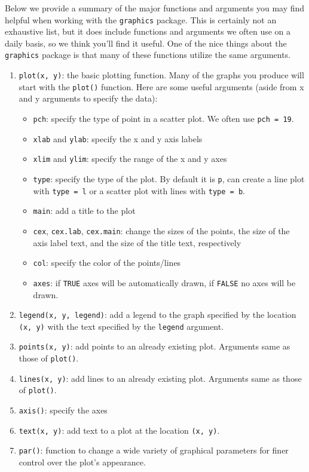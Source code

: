 \documentclass[]{krantz}
\providecommand{\tightlist}{%
  \setlength{\itemsep}{0pt}\setlength{\parskip}{0pt}}
\begin{document}
Below we provide a summary of the major functions and arguments you may
find helpful when working with the \texttt{graphics} package. This is
certainly not an exhaustive list, but it does include functions and
arguments we often use on a daily basis, so we think you'll find it
useful. One of the nice things about the \texttt{graphics} package is
that many of these functions utilize the same arguments.

\begin{enumerate}
\def\labelenumi{\arabic{enumi}.}
\tightlist
\item
  \texttt{plot(x,\ y)}: the basic plotting function. Many of the graphs
  you produce will start with the \texttt{plot()} function. Here are
  some useful arguments (aside from x and y arguments to specify the
  data):

  \begin{itemize}
  \tightlist
  \item
    \texttt{pch}: specify the type of point in a scatter plot. We often
    use \texttt{pch\ =\ 19}.
  \item
    \texttt{xlab} and \texttt{ylab}: specify the x and y axis labels
  \item
    \texttt{xlim} and \texttt{ylim}: specify the range of the x and y
    axes
  \item
    \texttt{type}: specify the type of the plot. By default it is
    \texttt{p}, can create a line plot with
    \texttt{type\ =\ \textquotesingle{}l\textquotesingle{}} or a scatter
    plot with lines with
    \texttt{type\ =\ \textquotesingle{}b\textquotesingle{}}.
  \item
    \texttt{main}: add a title to the plot
  \item
    \texttt{cex}, \texttt{cex.lab}, \texttt{cex.main}: change the sizes
    of the points, the size of the axis label text, and the size of the
    title text, respectively
  \item
    \texttt{col}: specify the color of the points/lines
  \item
    \texttt{axes}: if \texttt{TRUE} axes will be automatically drawn, if
    \texttt{FALSE} no axes will be drawn.
  \end{itemize}
\item
  \texttt{legend(x,\ y,\ legend)}: add a legend to the graph specified
  by the location \texttt{(x,\ y)} with the text specified by the
  \texttt{legend} argument.
\item
  \texttt{points(x,\ y)}: add points to an already existing plot.
  Arguments same as those of \texttt{plot()}.
\item
  \texttt{lines(x,\ y)}: add lines to an already existing plot.
  Arguments same as those of \texttt{plot()}.
\item
  \texttt{axis()}: specify the axes
\item
  \texttt{text(x,\ y)}: add text to a plot at the location
  \texttt{(x,\ y)}.
\item
  \texttt{par()}: function to change a wide variety of graphical
  parameters for finer control over the plot's appearance.
\end{enumerate}
\end{document}
